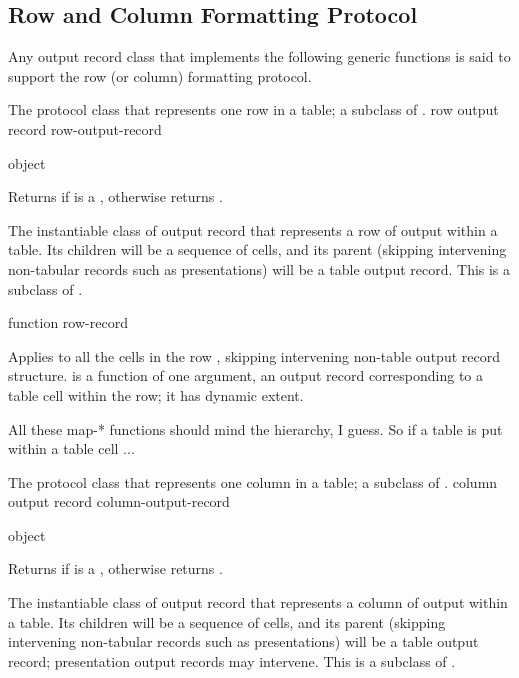 \subsection {Row and Column Formatting Protocol}

Any output record class that implements the following generic functions is said
to support the row (or column) formatting protocol.


The protocol class that represents one row in a table; a subclass of
.
 {row output record} {row-output-record}

 {object}

Returns  if  is a , otherwise
returns .


The instantiable class of output record that represents a row of output within a
table.  Its children will be a sequence of cells, and its parent (skipping
intervening non-tabular records such as presentations) will be a table output
record.  This is a subclass of .

 {function row-record}

Applies  to all the cells in the row , skipping
intervening non-table output record structure.   is a function of
one argument, an output record corresponding to a table cell within the row; it
has dynamic extent.

 {All these map-* functions should mind the hierarchy, I guess. So if a table is put within a table cell ...}


The protocol class that represents one column in a table; a subclass of
.
 {column output record} {column-output-record}

 {object}

Returns  if  is a , otherwise
returns .


The instantiable class of output record that represents a column of output within
a table.  Its children will be a sequence of cells, and its parent (skipping
intervening non-tabular records such as presentations) will be a table output
record; presentation output records may intervene.  This is a subclass of
.

